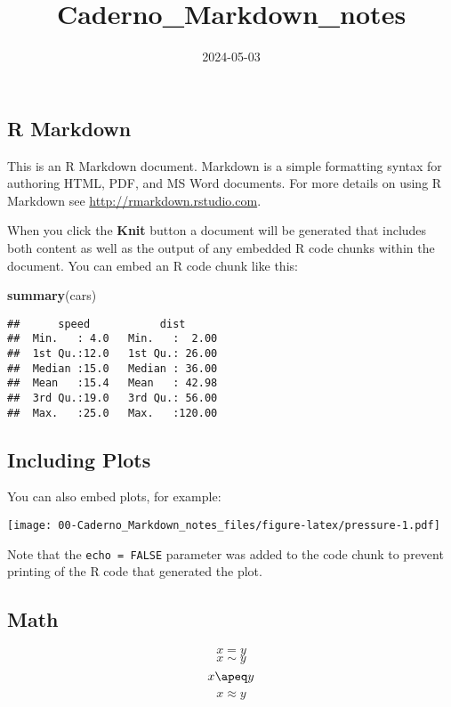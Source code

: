 \documentclass[
]{article}
\title{Caderno\_Markdown\_notes}
\author{}
\date{\vspace{-2.5em}2024-05-03}
\newenvironment{Shaded}{\begin{snugshade}}{\end{snugshade}}
\newcommand{\FunctionTok}[1]{\textcolor[rgb]{0.13,0.29,0.53}{\textbf{#1}}}
\newcommand{\NormalTok}[1]{#1}
\begin{document}
\maketitle

{
\setcounter{tocdepth}{2}
\tableofcontents
}
\subsection{R Markdown}\label{r-markdown}

This is an R Markdown document. Markdown is a simple formatting syntax
for authoring HTML, PDF, and MS Word documents. For more details on
using R Markdown see \url{http://rmarkdown.rstudio.com}.

When you click the \textbf{Knit} button a document will be generated
that includes both content as well as the output of any embedded R code
chunks within the document. You can embed an R code chunk like this:

\begin{Shaded}
\begin{Highlighting}[]
\FunctionTok{summary}\NormalTok{(cars)}
\end{Highlighting}
\end{Shaded}

\begin{verbatim}
##      speed           dist       
##  Min.   : 4.0   Min.   :  2.00  
##  1st Qu.:12.0   1st Qu.: 26.00  
##  Median :15.0   Median : 36.00  
##  Mean   :15.4   Mean   : 42.98  
##  3rd Qu.:19.0   3rd Qu.: 56.00  
##  Max.   :25.0   Max.   :120.00
\end{verbatim}

\subsection{Including Plots}\label{including-plots}

You can also embed plots, for example:

\texttt{[image: 00-Caderno\_Markdown\_notes\_files/figure-latex/pressure-1.pdf]}

Note that the \texttt{echo\ =\ FALSE} parameter was added to the code
chunk to prevent printing of the R code that generated the plot.

\subsection{Math}\label{math}

\[x = y \] \[ x \sim y\] \[ x \apeq y\] \[
   x \approx y
\]
\end{document}
